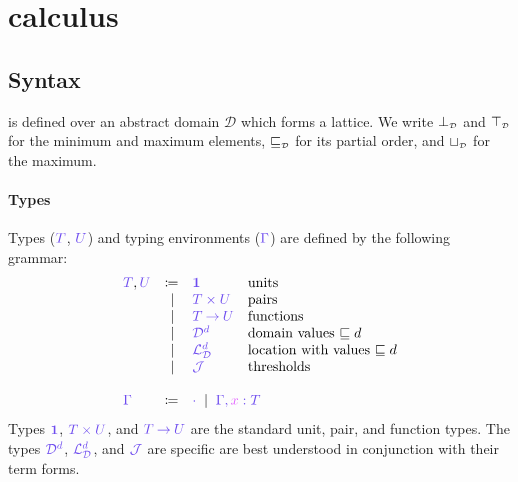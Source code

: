 \documentclass[main.tex]{subfiles}
\begin{document}
\section{\typedlambdalvar calculus}

\subsection{Syntax}%
\typedlambdalvar is defined over an abstract domain $\mathcal{D}$ which forms a lattice. We write ${\bot_{\scriptscriptstyle\mathcal{D}}}$ and ${\top_{\scriptscriptstyle\mathcal{D}}}$ for the minimum and maximum elements, $\mathbin{{\color{black}\sqsubseteq_{\scriptscriptstyle\mathcal{D}}}}$ for its partial order, and $\mathbin{{\color{black}\sqcup_{\scriptscriptstyle\mathcal{D}}}}$ for the maximum.

\paragraph*{Types}
Types ($\ty{T}$, $\ty{U}$) and typing environments ($\ty{\Gamma}$) are defined by the following grammar:
\[
\begin{array}{lrll}
  \ty{T}, \ty{U}
  & \coloneqq & \ty{\tyunit}        & \text{units} \\
  & \sep      & \ty{\typrod{T}{U}}  & \text{pairs} \\
  & \sep      & \ty{\tyfun{T}{U}}   & \text{functions}\\
  & \sep      & \ty{\tyD{d}}        & \text{domain values }{\sqsubseteq d}\\
  & \sep      & \ty{\tyL{d}}        & \text{location with values }{\sqsubseteq d}\\
  & \sep      & \ty{\tyJ}           & \text{thresholds}
  \\
  \\
  \ty{\Gamma}
  & \coloneqq & \multicolumn{2}{l}{\ty{\emptyenv}
    \sep        \ty{\ty{\Gamma},\tmty{x}{T}}}
\end{array}
\]
Types $\ty{\tyunit}$, $\ty{\typrod{T}{U}}$, and $\ty{\tyfun{T}{U}}$ are the standard unit, pair, and function types. The types $\tyD{d}$, $\tyL{d}$, and $\tyJ$ are specific are best understood in conjunction with their term forms.
\end{document}
